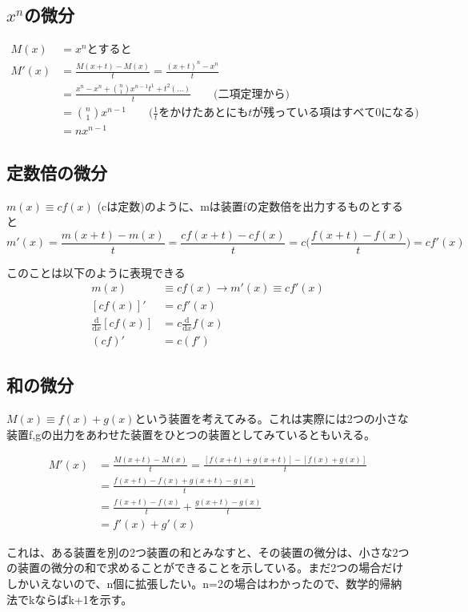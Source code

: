\documentclass[dvipdfmx]{jsarticle}
\begin{document}
\begin{enumerate}
\subsection{$x^n$の微分}
\begin{align*}
M(x) &= x^n とすると \\
M'(x) &= \frac{M(x+t)-M(x)}{t} = \frac{(x+t)^n - x^n}{t} \\
&= \frac{x^n - x^n + \binom {n}{1}x^{n-1}t^1 + t^2(...)}{t} \qquad \text{(二項定理から)} \\
&=  \binom{n}{1} x^{n-1} \qquad \text{($\frac{1}{t}をかけたあとにもtが残っている項はすべて0になる$)} \\
&= nx^{n-1}
\end{align*}

\subsection{定数倍の微分}

$m(x) \equiv cf(x)$ (cは定数)のように、mは装置fの定数倍を出力するものとすると
\[ m'(x) = \frac{m(x+t) - m(x)}{t} = \frac{cf(x+t) - cf(x)}{t} = c \biggl( \frac{f(x+t) -f(x)}{t} \biggl) = cf'(x) \]

このことは以下のように表現できる
\begin{align*}
  m(x) &\equiv cf(x) \rightarrow m'(x) \equiv cf'(x) \\
  [cf(x)]' &= cf'(x) \\
  \frac{\mathrm{d}}{\mathrm{d}x}[cf(x)] &= c\frac{\mathrm{d}}{\mathrm{d}x}f(x) \\
  (cf)' &= c(f')
\end{align*}

\subsection{和の微分}

$M(x) \equiv f(x) + g(x)$という装置を考えてみる。これは実際には2つの小さな装置f,gの出力をあわせた装置をひとつの装置としてみているともいえる。

\begin{align*}
M'(x) &= \frac{M(x+t)-M(x)}{t} = \frac{[f(x+t)+g(x+t)] - [f(x)+g(x)]}{t} \\
&= \frac{f(x+t)-f(x) + g(x+t) -g(x)}{t} \\
&= \frac{f(x+t)-f(x)}{t} + \frac{g(x+t) -g(x)}{t} \\
&= f'(x) + g'(x)
\end{align*}

これは、ある装置を別の2つ装置の和とみなすと、その装置の微分は、小さな2つの装置の微分の和で求めることができることを示している。まだ2つの場合だけしかいえないので、n個に拡張したい。n=2の場合はわかったので、数学的帰納法でkならばk+1を示す。


\end{enumerate}
\end{document}
